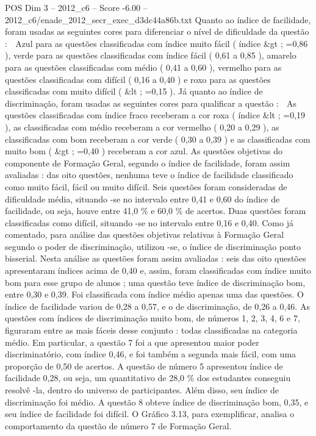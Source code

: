 \begin{textsample}{POS Dim 3 – 2012\_c6 – Score -6.00 – 2012\_c6/enade\_2012\_secr\_exec\_d3dc44a86b.txt}
Quanto ao índice de facilidade, foram usadas as seguintes cores para diferenciar o nível de dificuldade da questão :  Azul para as questões classificadas com índice muito fácil ( índice \&gt ; =0,86 ), verde para as questões classificadas com índice fácil ( 0,61 a 0,85 ), amarelo para as questões classificadas com médio ( 0,41 a 0,60 ), vermelho para as questões classificadas com difícil ( 0,16 a 0,40 ) e roxo para as questões classificadas com muito difícil ( \&lt ; =0,15 ).
Já quanto ao índice de discriminação, foram usadas as seguintes cores para qualificar a questão :  As questões classificadas com índice fraco receberam a cor roxa ( índice \&lt ; =0,19 ), as classificadas com médio receberam a cor vermelho ( 0,20 a 0,29 ), as classificadas com bom receberam a cor verde ( 0,30 a 0,39 ) e as classificadas com muito bom ( \&gt ; =0,40 ) receberam a cor azul.
As questões objetivas do componente de Formação Geral, segundo o índice de facilidade, foram assim avaliadas : das oito questões, nenhuma teve o índice de facilidade classificado como muito fácil, fácil ou muito difícil.
Seis questões foram consideradas de dificuldade média, situando -se no intervalo entre 0,41 e 0,60 do índice de facilidade, ou seja, houve entre 41,0 \% e 60,0 \% de acertos.
Duas questões foram classificadas como difícil, situando -se no intervalo entre 0,16 e 0,40.
Como já comentado, para análise das questões objetivas relativas à Formação Geral segundo o poder de discriminação, utilizou -se, o índice de discriminação ponto bisserial.
Nesta análise as questões foram assim avaliadas : seis das oito questões apresentaram índices acima de 0,40 e, assim, foram classificadas com índice muito bom para esse grupo de alunos ; uma questão teve índice de discriminação bom, entre 0,30 e 0,39.
Foi classificada com índice médio apenas uma das questões.
O índice de facilidade variou de 0,28 a 0,57, e o de discriminação, de 0,26 a 0,46.
As questões com índices de discriminação muito bom, de números 1, 2, 3, 4, 6 e 7, figuraram entre as mais fáceis desse conjunto : todas classificadas na categoria médio.
Em particular, a questão 7 foi a que apresentou maior poder discriminatório, com índice 0,46, e foi também a segunda mais fácil, com uma proporção de 0,50 de acertos.
A questão de número 5 apresentou índice de facilidade 0,28, ou seja, um quantitativo de 28,0 \% dos estudantes conseguiu resolvê -la, dentro do universo de participantes.
Além disso, seu índice de discriminação foi médio.
A questão 8 obteve índice de discriminação bom, 0,35, e seu índice de facilidade foi difícil.
O Gráfico 3.13, para exemplificar, analisa o comportamento da questão de número 7 de Formação Geral.

\end{textsample}
